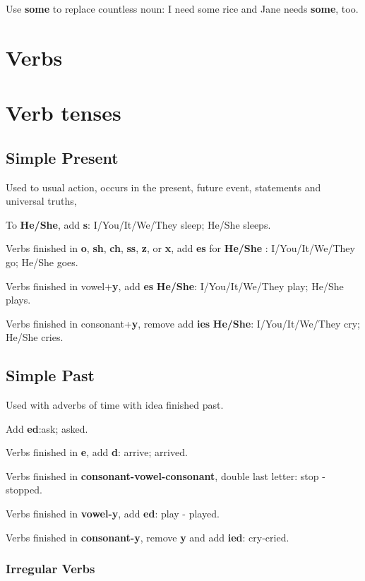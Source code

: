 \documentclass[a4paper, titlepage]{article}
\begin{document}
Use \textbf{some} to replace countless noun: I need some rice and Jane needs \textbf{some}, too.
\section{Verbs}
\section{Verb tenses}
\subsection{Simple Present}
Used to usual action, occurs in the present, future event, statements and universal truths,


To \textbf{He/She}, add \textbf{s}: I/You/It/We/They sleep; He/She sleeps.

Verbs finished in \textbf{o}, \textbf{sh}, \textbf{ch}, \textbf{ss}, \textbf{z}, or \textbf{x}, add \textbf{es} for  \textbf{He/She} :  I/You/It/We/They go; He/She goes.


Verbs finished in vowel+\textbf{y}, add \textbf{es}  \textbf{He/She}: I/You/It/We/They play; He/She plays.


Verbs finished in consonant+\textbf{y}, remove add \textbf{ies}  \textbf{He/She}:  I/You/It/We/They cry; He/She cries.
\subsection{Simple Past}

Used with adverbs of time with idea finished past. 

Add \textbf{ed}:ask; asked.

Verbs finished in \textbf{e}, add \textbf{d}: arrive; arrived.

Verbs finished in \textbf{consonant-vowel-consonant}, double last letter: stop - stopped.

Verbs finished in \textbf{vowel-y}, add \textbf{ed}: play - played.

Verbs finished in \textbf{consonant-y}, remove \textbf{y} and add \textbf{ied}: cry-cried.

\subsubsection{Irregular Verbs}
\end{document}

